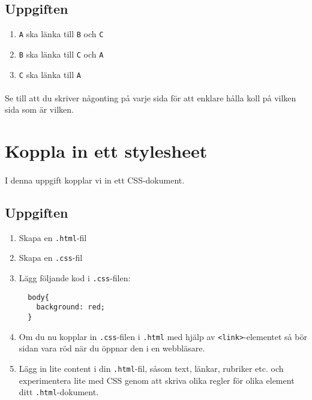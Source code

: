 \documentclass{article}
\begin{document}
    \subsection*{Uppgiften}
      \begin{enumerate}
        \item \texttt{A} ska länka till \texttt{B} och \texttt{C}
        \item \texttt{B} ska länka till \texttt{C} och \texttt{A}
        \item \texttt{C} ska länka till \texttt{A}
      \end{enumerate}

    \paragraph{}
    Se till att du skriver någonting på varje sida för att enklare hålla koll på vilken sida som är vilken.




  \newpage
  \section{ Koppla in ett stylesheet }
    \paragraph{}
    I denna uppgift kopplar vi in ett CSS-dokument.

    \subsection*{Uppgiften}
      \begin{enumerate}
        \item Skapa en \texttt{.html}-fil
        \item Skapa en \texttt{.css}-fil
        \item Lägg följande kod i \texttt{.css}-filen:
          \begin{lstlisting}
  body{
    background: red;
  }
          \end{lstlisting}
        \item Om du nu kopplar in \texttt{.css}-filen i \texttt{.html} med hjälp av \texttt{<link>}-elementet så bör sidan vara röd när du öppnar den i en webbläsare.
        \item Lägg in lite content i din \texttt{.html}-fil, såsom text, länkar, rubriker etc. och experimentera lite med CSS genom att skriva olika regler för olika element ditt \texttt{.html}-dokument.
      \end{enumerate}
\end{document}
